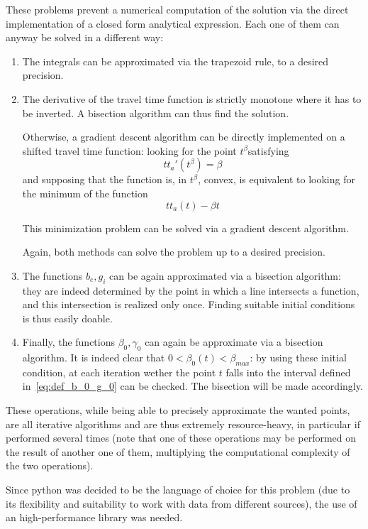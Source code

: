 These problems prevent a numerical computation of the solution via the direct implementation of a closed form analytical expression.
Each one of them can anyway be solved in a different way:
\begin{enumerate}
\item The integrals can be approximated via the trapezoid rule,
  to a desired precision.
\item The derivative of the travel time function is strictly monotone where it has to be inverted.
  A bisection algorithm can thus find the solution.

  Otherwise, a gradient descent algorithm can be directly implemented on a shifted travel time function:
  looking for the point \(t^\beta\)satisfying
  \begin{equation*}
    tt_a'(t^\beta) = \beta
  \end{equation*}
  and supposing that the function is, in \(t^\beta\), convex,
  is equivalent to looking for the minimum of the function
  \begin{equation*}
    tt_a(t) - \beta t
  \end{equation*}

  This minimization problem can be solved via a gradient descent algorithm.

  Again, both methods can solve the problem up to a desired precision.
\item The functions \(b_e, g_i\) can be again approximated via a bisection algorithm:
  they are indeed determined by the point in which a line intersects a function,
  and this intersection is realized only once.
  Finding suitable initial conditions is thus easily doable.
\item Finally, the functions \(\beta_0, \gamma_0\) can again be approximate via a bisection algorithm.
  It is indeed clear that \(0 < \beta_0(t) < \beta_{max}\):
  by using these initial condition,
  at each iteration wether the point \(t\) falls into the interval defined in~\eqref{eq:def_b_0_g_0} can be checked.
  The bisection will be made accordingly.
\end{enumerate}

These operations, while being able to precisely approximate the wanted points,
are all iterative algorithms and are thus extremely resource-heavy,
in particular if performed several times
(note that one of these operations may be performed on the result of another one of them,
multiplying the computational complexity of the two operations).

Since python was decided to be the language of choice for this problem
(due to its flexibility and suitability to work with data from different sources),
the use of an high-performance library was needed.

